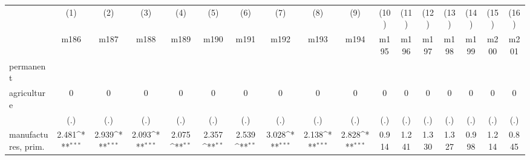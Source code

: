 {
\def\sym#1{\ifmmode^{#1}\else\(^{#1}\)\fi}
\begin{tabular}{l*{16}{c}}
\hline\hline
                    &\multicolumn{1}{c}{(1)}&\multicolumn{1}{c}{(2)}&\multicolumn{1}{c}{(3)}&\multicolumn{1}{c}{(4)}&\multicolumn{1}{c}{(5)}&\multicolumn{1}{c}{(6)}&\multicolumn{1}{c}{(7)}&\multicolumn{1}{c}{(8)}&\multicolumn{1}{c}{(9)}&\multicolumn{1}{c}{(10)}&\multicolumn{1}{c}{(11)}&\multicolumn{1}{c}{(12)}&\multicolumn{1}{c}{(13)}&\multicolumn{1}{c}{(14)}&\multicolumn{1}{c}{(15)}&\multicolumn{1}{c}{(16)}\\
                    &\multicolumn{1}{c}{m186}&\multicolumn{1}{c}{m187}&\multicolumn{1}{c}{m188}&\multicolumn{1}{c}{m189}&\multicolumn{1}{c}{m190}&\multicolumn{1}{c}{m191}&\multicolumn{1}{c}{m192}&\multicolumn{1}{c}{m193}&\multicolumn{1}{c}{m194}&\multicolumn{1}{c}{m195}&\multicolumn{1}{c}{m196}&\multicolumn{1}{c}{m197}&\multicolumn{1}{c}{m198}&\multicolumn{1}{c}{m199}&\multicolumn{1}{c}{m200}&\multicolumn{1}{c}{m201}\\
\hline
permanent           &                     &                     &                     &                     &                     &                     &                     &                     &                     &                     &                     &                     &                     &                     &                     &                     \\
agriculture         &           0         &           0         &           0         &           0         &           0         &           0         &           0         &           0         &           0         &           0         &           0         &           0         &           0         &           0         &           0         &           0         \\
                    &         (.)         &         (.)         &         (.)         &         (.)         &         (.)         &         (.)         &         (.)         &         (.)         &         (.)         &         (.)         &         (.)         &         (.)         &         (.)         &         (.)         &         (.)         &         (.)         \\
[1em]
manufactures, prim. &       2.481\sym{***}&       2.939\sym{***}&       2.093\sym{***}&       2.075\sym{**} &       2.357\sym{**} &       2.539\sym{**} &       3.028\sym{***}&       2.138\sym{***}&       2.828\sym{***}&       0.914         &       1.241         &       1.330         &       1.327         &       0.998         &       1.214         &       0.845         \\

\end{tabular}}
